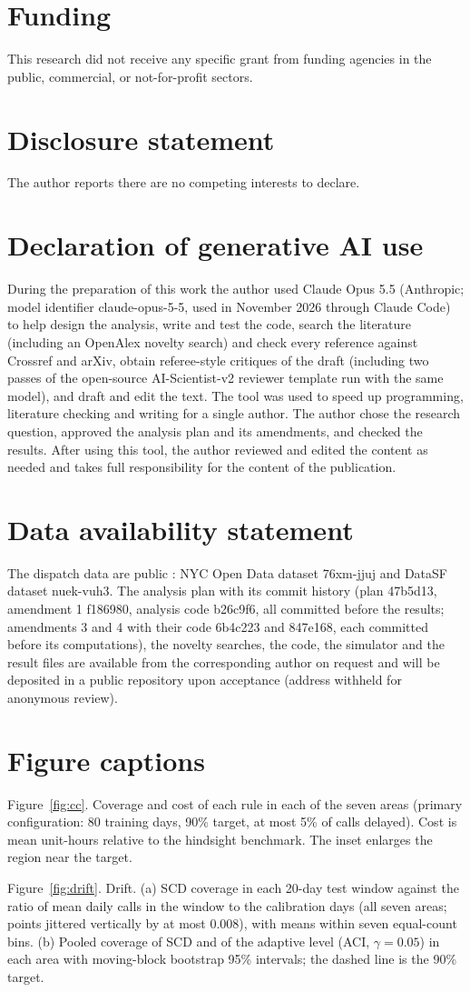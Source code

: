 \documentclass[12pt]{article}
\newcommand{\capFigCC}{Coverage and cost of each rule in each of the seven areas (primary configuration: 80 training days, 90\% target, at most 5\% of calls delayed). Cost is mean unit-hours relative to the hindsight benchmark. The inset enlarges the region near the target.}
\newcommand{\capFigDrift}{Drift. (a) SCD coverage in each 20-day test window against the ratio of mean daily calls in the window to the calibration days (all seven areas; points jittered vertically by at most 0.008), with means within seven equal-count bins. (b) Pooled coverage of SCD and of the adaptive level (ACI, $\gamma=0.05$) in each area with moving-block bootstrap 95\% intervals; the dashed line is the 90\% target.}
\begin{document}
\section*{Funding}
This research did not receive any specific grant from funding agencies in the public, commercial, or not-for-profit sectors.

\section*{Disclosure statement}
The author reports there are no competing interests to declare.

\section*{Declaration of generative AI use}
During the preparation of this work the author used Claude Opus 5.5 (Anthropic; model identifier claude-opus-5-5, used in November 2026 through Claude Code) to help design the analysis, write and test the code, search the literature (including an OpenAlex novelty search) and check every reference against Crossref and arXiv, obtain referee-style critiques of the draft (including two passes of the open-source AI-Scientist-v2 reviewer template run with the same model), and draft and edit the text. The tool was used to speed up programming, literature checking and writing for a single author. The author chose the research question, approved the analysis plan and its amendments, and checked the results. After using this tool, the author reviewed and edited the content as needed and takes full responsibility for the content of the publication.

\section*{Data availability statement}
The dispatch data are public \citep{nycems2026,sffire2026}: NYC Open Data dataset 76xm-jjuj and DataSF dataset nuek-vuh3. The analysis plan with its commit history (plan 47b5d13, amendment 1 f186980, analysis code b26c9f6, all committed before the results; amendments 3 and 4 with their code 6b4c223 and 847e168, each committed before its computations), the novelty searches, the code, the simulator and the result files are available from the corresponding author on request and will be deposited in a public repository upon acceptance (address withheld for anonymous review).




\clearpage
\processdelayedfloats
\clearpage
\section*{Figure captions}
\noindent Figure~\ref{fig:cc}. \capFigCC

\medskip\noindent Figure~\ref{fig:drift}. \capFigDrift
\end{document}
